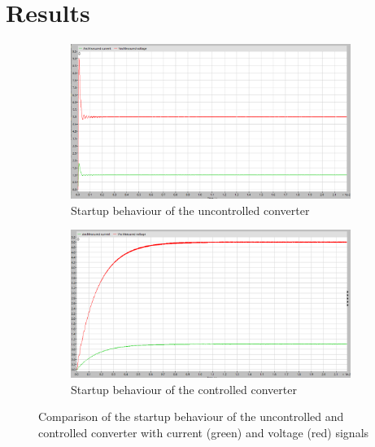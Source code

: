 \chapter{Results}
\label{chapter:results}

\begin{figure}[htbp]
    \centering
    \begin{subfigure}[b]{0.49\textwidth}
        \centering
        \includegraphics[width=\textwidth]{img/v_i_zoomed_constant_load.png}
        \caption{Startup behaviour of the uncontrolled converter}
        \label{fig:v_i_startup_uncontrolled}
    \end{subfigure}
    \hfill
    \begin{subfigure}[b]{0.49\textwidth}
        \centering
        \includegraphics[width=\textwidth]{img/v_i_zoomed_control_constant_load.png}
        \caption{Startup behaviour of the controlled converter}
        \label{fig:v_i_startup_controlled}
    \end{subfigure}
    \caption{Comparison of the startup behaviour of the uncontrolled and controlled converter with current (green) and voltage (red) signals}
    \label{fig:comparison_startup}
\end{figure}

